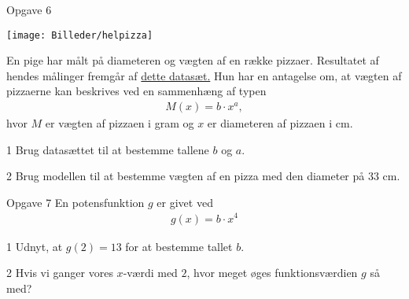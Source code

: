 \begin{opgavetekst}{Opgave 6}
	\begin{center}
		\texttt{[image: Billeder/helpizza]}
	\end{center}	
	En pige har målt på diameteren og vægten af en række pizzaer. Resultatet af hendes målinger fremgår af \href{https://github.com/ChristianJLex/TeachingNotes/raw/master/2023-2024/Data og lign/Pizzavaegt.xlsx}{\color{blue!60} dette datasæt.} Hun har en antagelse om, at vægten af pizzaerne kan beskrives ved en sammenhæng af typen
	\begin{align*}
		M(x) = b \cdot x^a,
	\end{align*}
	hvor $M$ er vægten af pizzaen i gram og $x$ er diameteren af pizzaen i cm.
\end{opgavetekst}
\begin{delopgave}{}{1}
	Brug datasættet til at bestemme tallene $b$ og $a$.
\end{delopgave}	
\begin{delopgave}{}{2}
	Brug modellen til at bestemme vægten af en pizza med den diameter på 33 cm.
\end{delopgave}
\begin{opgavetekst}{Opgave 7}
	En potensfunktion $g$ er givet ved
	\begin{align*}
		g(x) = b \cdot x^4	
	\end{align*}
\end{opgavetekst}
\begin{delopgave}{}{1}
	Udnyt, at $g(2) = 13$ for at bestemme tallet $b$.
\end{delopgave}
\begin{delopgave}{}{2}
	Hvis vi ganger vores $x$-værdi med $2$, hvor meget øges funktionsværdien $g$ så med?
\end{delopgave}
